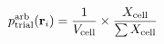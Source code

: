 \documentclass[12pt]{article}
\begin{document}
\begin{displaymath}
p_{\rm trial}^{\rm arb}({\bf r}_i) = 
{
{1}
\over
{V_{\rm cell}}
}
\times
{
{X_{\rm cell}}
\over
{\sum X_{\rm cell}}
}
\end{displaymath}
\end{document}
